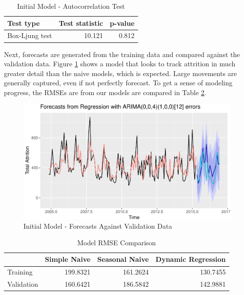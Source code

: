 \documentclass[12pt,letterpaper,toc=flat,oneside]{report}
\theoremstyle{definition}
\theoremstyle{definition}
\theoremstyle{definition}
\theoremstyle{remark}
\begin{document}
\begin{table}

\caption{\label{tab:dynreg1-boxtest}Initial Model - Autocorrelation Test}
\centering
\begin{tabular}[t]{l|r|r}
\hline
Test type & Test statistic & p-value\\
\hline
Box-Ljung test & 10.121 & 0.812\\
\hline
\end{tabular}
\end{table}

Next, forecasts are generated from the training data and compared
against the validation data. Figure \ref{fig:dynreg1-forecast} shows a
model that looks to track attrition in much greater detail than the
naive models, which is expected. Large movements are generally captured,
even if not perfectly forecast. To get a sense of modeling progress, the
RMSEs are from our models are compared in Table
\ref{tab:model-compare-1}.

\begin{figure}[H]

{\centering \includegraphics{elliott-econometric-personnel-retention-18_files/figure-latex/dynreg1-forecast-1} 

}

\caption{Initial Model - Forecasts Against Validation Data}\label{fig:dynreg1-forecast}
\end{figure}

\begin{table}

\caption{\label{tab:model-compare-1}Model RMSE Comparison}
\centering
\begin{tabular}[t]{l|r|r|r}
\hline
  & Simple Naive & Seasonal Naive & Dynamic Regression\\
\hline
Training & 199.8321 & 161.2624 & 130.7455\\
\hline
Validation & 160.6421 & 186.5842 & 142.9881\\
\hline
\end{tabular}
\end{table}
\end{document}
